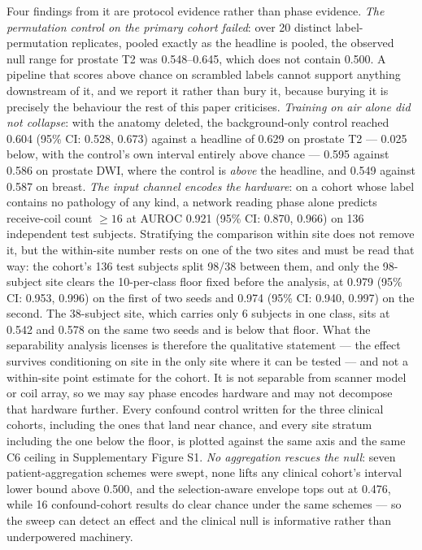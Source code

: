 \documentclass[11pt,a4paper]{article}
\begin{document}
Four findings from it are protocol evidence rather than phase evidence.
\emph{The permutation control on the primary cohort failed}: over 20 distinct
label-permutation replicates, pooled exactly as the headline is pooled, the
observed null range for prostate T2 was 0.548--0.645, which does not contain
0.500. A pipeline that scores above chance on scrambled labels cannot support
anything downstream of it, and we report it rather than bury it, because burying
it is precisely the behaviour the rest of this paper criticises. \emph{Training
on air alone did not collapse}: with the anatomy deleted, the background-only
control reached 0.604 (95\% CI: 0.528, 0.673) against a headline of 0.629 on
prostate T2 --- 0.025 below, with the control's own interval entirely above chance
--- 0.595 against 0.586 on prostate DWI, where the control is \emph{above} the
headline, and 0.549 against 0.587 on breast. \emph{The input channel encodes the
hardware}: on a cohort whose label contains no pathology of any kind, a network
reading phase alone predicts receive-coil count $\geq 16$ at AUROC 0.921 (95\%
CI: 0.870, 0.966) on 136 independent test subjects. Stratifying the comparison
within site does not remove it, but the within-site number rests on one of the
two sites and must be read that way: the cohort's 136 test subjects split 98/38
between them, and only the 98-subject site clears the 10-per-class floor fixed
before the analysis, at 0.979 (95\% CI: 0.953, 0.996) on the first of two seeds
and 0.974 (95\% CI: 0.940, 0.997) on the second. The 38-subject site, which
carries only 6 subjects in one class, sits at 0.542 and 0.578 on the same two
seeds and is below that floor. What the separability analysis licenses is
therefore the qualitative statement --- the effect survives conditioning on site
in the only site where it can be tested --- and not a within-site point estimate
for the cohort. It is not
separable from scanner model or coil array, so we may say phase encodes hardware
and may not decompose that hardware further. Every confound control written for
the three clinical cohorts, including the ones that land near chance, and every
site stratum including the one below the floor, is plotted
against the same axis and the same C6 ceiling in Supplementary
Figure S1. \emph{No aggregation rescues the
null}: seven patient-aggregation schemes were swept, none lifts any clinical
cohort's interval lower bound above 0.500, and the selection-aware envelope tops
out at 0.476, while 16 confound-cohort results do clear chance under the same
schemes --- so the sweep can detect an effect and the clinical null is
informative rather than underpowered machinery.
\end{document}
